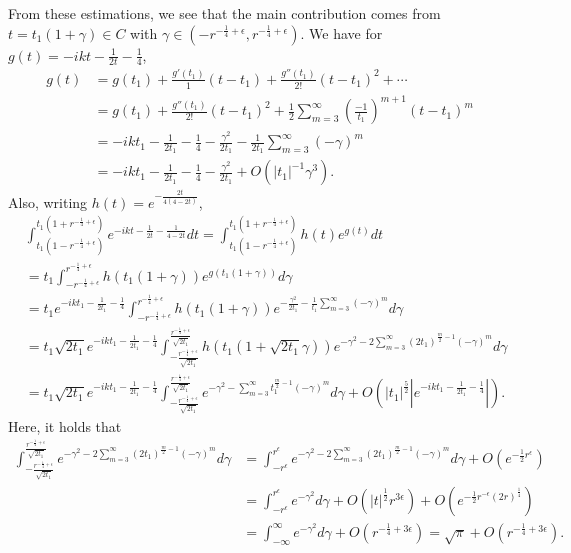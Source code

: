 \documentclass[11pt]{amsart}
\numberwithin{theorem}{section}
\numberwithin{equation}{section}
\theoremstyle{remark}
\theoremstyle{definition}
\begin{document}
From these estimations, we see that the main contribution comes from $t=t_1(1+\gamma)\in C$ with $\gamma\in (-r^{-\frac{1}{4}+\epsilon},r^{-\frac{1}{4}+\epsilon})$.
We have for $g(t)=-ikt-\frac{1}{2t}-\frac{1}{4}$, 
\begin{align*}
g(t)&=g(t_1)+\frac{g'(t_1)}{1}(t-t_1)+\frac{g''(t_1)}{2!}(t-t_1)^2+\cdots\\
&=g(t_1)+\frac{g''(t_1)}{2!}(t-t_1)^2+\frac{1}{2}\sum_{m=3}^{\infty}\left(\frac{-1}{t_1}\right)^{m+1}(t-t_1 )^m \\
&=-ikt_1-\frac{1}{2t_1}-\frac{1}{4}-\frac{\gamma^2}{2t_1}-\frac{1}{2t_1}\sum_{m=3}^{\infty}( -\gamma)^m\\
&=-ikt_1-\frac{1}{2t_1}-\frac{1}{4}-\frac{\gamma^2}{2t_1}+O(|t_1|^{-1}\gamma^3).
\end{align*}
Also, writing $h(t)=e^{-\frac{2t}{4(4-2t)}}$,
\begin{align*}
&\int_{t_1(1-r^{-\frac{1}{4}+\epsilon})}^{t_1(1+r^ { -\frac{1}{4}+\epsilon})}e^{-ikt-\frac{1}{2t}-\frac{1}{4-2t}}dt=\int_{t_1(1-r^{-\frac{1}{4}+\epsilon})}^{t_1(1+r^ { -\frac{1}{4}+\epsilon})}h(t)e^{g(t) }dt\\
&=t_1\int_{ -r^{-\frac{1}{4}+\epsilon} }^{ r^ { -\frac{1}{4}+\epsilon} }h(t_1(1+\gamma))e^{g(t_1(1+\gamma)) }d\gamma\\
&=t_1e^{-ikt_1-\frac{1}{2t_1}-\frac{1}{4}}\int_{ -r^{-\frac{1}{4}+\epsilon} }^{ r^ { -\frac{1}{4}+\epsilon} }h(t_1(1+\gamma))e^{-\frac{\gamma^2}{2t_1}-\frac{1}{t_1}\sum_{m=3}^{\infty}(-\gamma)^m}d\gamma \\
&=t_1\sqrt{2t_1}e^{-ikt_1-\frac{1}{2t_1}-\frac{1}{4}}\int_{ -\frac{r^{-\frac{1}{4}+\epsilon}}{\sqrt{2t_1}} }^{\frac{r^ { -\frac{1}{4}+\epsilon}}{\sqrt{2t_1}}}h(t_1(1+\sqrt{2t_1}\gamma))e^{- \gamma^2 - 2\sum_{m=3}^{\infty}(2t_1)^{\frac{m}{2}-1}(-\gamma)^m}d\gamma\\ 
&=t_1\sqrt{2t_1}e^{-ikt_1-\frac{1}{2t_1}-\frac{1}{4}}\int_{ -\frac{r^{-\frac{1}{4}+\epsilon}}{\sqrt{2t_1}} }^{\frac{r^ { -\frac{1}{4}+\epsilon}}{\sqrt{2t_1}}} e^{- \gamma^2 - \sum_{m=3}^{\infty}t_1^{\frac{m}{2}-1}(-\gamma)^m}d\gamma+O\left(|t_1|^{\frac{5}{2}}|e^{-ikt_1-\frac{1}{2t_1}-\frac{1}{4}}|\right).
\end{align*}
Here, it holds that
\begin{align*}
\int_{ -\frac{r^{-\frac{1}{4}+\epsilon}}{\sqrt{2t_1}} }^{\frac{r^ { -\frac{1}{4}+\epsilon}}{\sqrt{2t_1}}} e^{- \gamma^2 - 2\sum_{m=3}^{\infty}(2t_1)^{\frac{m}{2}-1}(-\gamma)^m}d\gamma &=  \int_{ -  r^{\epsilon}}^{ r^ { \epsilon}} e^{- \gamma^2 -2 \sum_{m=3}^{\infty}(2t_1)^{\frac{m}{2}-1}(-\gamma)^m}d\gamma+O(e^{-\frac{1}{2}r^{\epsilon}})\\
&=\int_{ -r^{\epsilon} }^{ r^ {\epsilon}} e^{- \gamma^2} d\gamma+O(|t|^{\frac{1}{2}}r^{3\epsilon})+O(e^{-\frac{1}{2}r^{-\epsilon}(2r)^{\frac{1}{4}}}) \\ &= \int_{ - \infty }^{ \infty} e^{- \gamma^2 }d\gamma+O(r^{-\frac{1}{4}+3\epsilon})= \sqrt{\pi}+O(r^{-\frac{1}{4}+3\epsilon}).
\end{align*}
\end{document}
